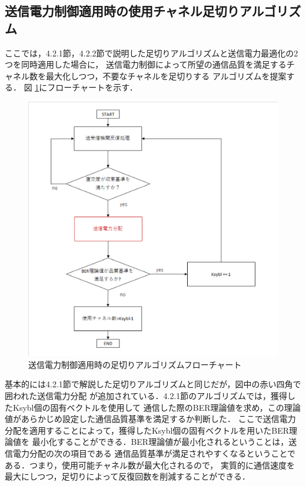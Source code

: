\subsection{送信電力制御適用時の使用チャネル足切りアルゴリズム}
ここでは，4.2.1節，4.2.2節で説明した足切りアルゴリズムと送信電力最適化の2つを同時適用した場合に，
送信電力制御によって所望の通信品質を満足するチャネル数を最大化しつつ，不要なチャネルを足切りする
アルゴリズムを提案する．
図 \ref{figCombFlow}にフローチャートを示す．
\begin{figure}
    \centering
    \includegraphics[width=0.95\linewidth]{chapter4/figure/CombFlow.eps}
    \caption{送信電力制御適用時の足切りアルゴリズムフローチャート}
    \label{figCombFlow}
\end{figure}
基本的には4.2.1節で解説した足切りアルゴリズムと同じだが，図中の赤い四角で囲われた送信電力分配
が追加されている．4.2.1節のアルゴリズムでは，獲得したKsybl個の固有ベクトルを使用して
通信した際のBER理論値を求め，この理論値があらかじめ設定した通信品質基準を満足するか判断した．
ここで送信電力分配を適用することによって，獲得したKsybl個の固有ベクトルを用いたBER理論値を
最小化することができる．BER理論値が最小化されるということは，送信電力分配の次の項目である
通信品質基準が満足されやすくなるということである．つまり，使用可能チャネル数が最大化されるので，
実質的に通信速度を最大にしつつ，足切りによって反復回数を削減することができる．

